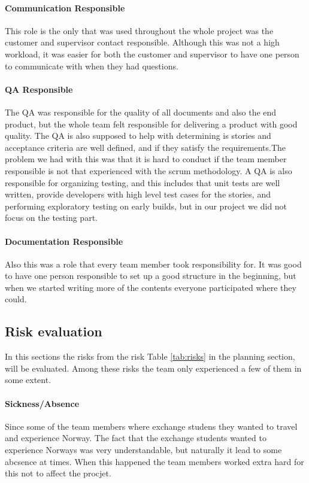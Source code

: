 \paragraph{Communication Responsible}
This role is the only that was used throughout the whole project was the customer and supervisor contact responsible. Although this was not a high workload, it was easier for both the customer and supervisor to have one person to communicate with when they had questions.  

\paragraph{QA Responsible}
The QA was responsible for the quality of all documents and also the end product, but the whole team felt responsible for delivering a product with good quality. The QA is also supposed to help with determining is stories and acceptance criteria are well defined, and if they satisfy the requirements.The problem we had with this was that it is hard to conduct if the team member responsible is not that experienced with the scrum methodology. A QA is also responsible for organizing testing, and this includes that unit tests are well written, provide developers with high level test cases for the stories, and performing exploratory testing on early builds, but in our project we did not focus on the testing part. 

\paragraph{Documentation Responsible}
Also this was a role that every team member took responsibility for. It was good to have one person responsible to set up a good structure in the beginning, but when we started writing more of the contents everyone participated where they could. 

\subsection{Risk evaluation}
In this sections the risks from the risk Table \ref{tab:risks} in the planning section, will be evaluated. Among these risks the team only experienced a few of them in some extent.

\paragraph{Sickness/Absence}
Since some of the team members where exchange studens they wanted to travel and experience Norway. The fact that the exchange students wanted to experience Norways was very understandable, but naturally it lead to some abcsence at times. When this happened the team members worked extra hard for this not to affect the procjet. 

